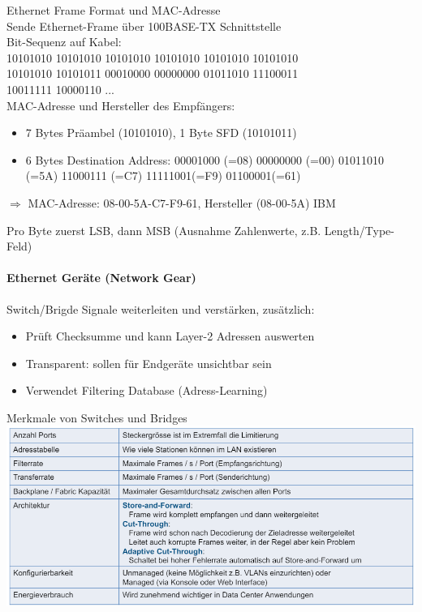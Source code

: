 \begin{example2}{Ethernet Frame Format und MAC-Adresse}\\
    Sende Ethernet-Frame über 100BASE-TX Schnittstelle\\ Bit-Sequenz auf Kabel:\\
    10101010 10101010 10101010 10101010 10101010 10101010\\
    10101010 10101011 00010000 00000000 01011010 11100011\\
    10011111 10000110 ...\\
    MAC-Adresse und Hersteller des Empfängers:
    \begin{itemize}
        \item 7 Bytes Präambel (10101010), 1 Byte SFD (10101011)
        \item 6 Bytes Destination Address: 00001000 (=08) 00000000 (=00) 01011010 (=5A) 11000111 (=C7) 11111001(=F9) 01100001(=61)
    \end{itemize}
    $\Rightarrow$ MAC-Adresse: 08-00-5A-C7-F9-61, Hersteller (08-00-5A) IBM
\end{example2}

\begin{remark}
    Pro Byte zuerst LSB, dann MSB (Ausnahme Zahlenwerte, z.B. Length/Type-Feld)
\end{remark}

\paragraph{Ethernet Geräte (Network Gear)}

\begin{definition}{Switch/Brigde} Signale weiterleiten und verstärken, zusätzlich:
    \begin{itemize}
        \item Prüft Checksumme und kann Layer-2 Adressen auswerten
        \item Transparent: sollen für Endgeräte unsichtbar sein
        \item Verwendet Filtering Database (Adress-Learning)
    \end{itemize}
\end{definition}

\begin{theorem}{Merkmale von Switches und Bridges}\\
    \includegraphics[width=1\linewidth]{images/merkmale_switches_bridges.png}
\end{theorem}


